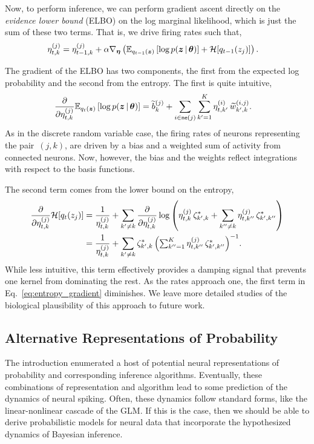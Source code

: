 Now, to perform inference, we can perform gradient ascent directly on the
\emph{evidence lower bound} (ELBO) on the log marginal likelihood,
which is just the sum of these two terms. That is, we drive firing
rates such that,
\begin{align*}
  \eta_{t,k}^{(j)} %
  &= \eta_{t-1,k}^{(j)} +
  \alpha \nabla_{\boldsymbol{\eta}} \left( \bbE_{q_{t-1}(\bz)} \left[ \log p(\bz \given \btheta) \right] + \mcH[q_{t-1}(z_j)] \right).
\end{align*}

The gradient of the ELBO has two components, the first from the
expected log probability and the second from the entropy. The first is
quite intuitive,
\begin{align*}
  \frac{\partial}{\partial \eta_{t,k}^{(j)}} \mathbb{E}_{q_t(\boldsymbol{z})} \left[ \log p(\boldsymbol{z} \,|\, \boldsymbol{\theta}) \right]
  &=
  \widetilde{b}_k^{(j)} +
  \sum_{i \in \mathsf{ne}(j)} \sum_{k'=1}^K \eta_{t,k'}^{(i)} \, \widetilde{w}_{k',k}^{(i,j)}.
\end{align*} 
As in the discrete random variable case, the firing rates of neurons representing
the pair~$(j,k)$, are driven by a bias and a weighted sum of activity from
connected neurons. Now, however, the bias and the weights reflect integrations
with respect to the basis functions.

The second term comes from the lower bound on the entropy, 
\begin{align}
  \frac{\partial}{\partial \eta_{t,k}^{(j)}} \mathcal{H}[q_t(z_j)] 
  &=
  \frac{1}{\eta_{t,k}^{(j)}}
  + \sum_{k' \neq k} \frac{\partial}{\partial \eta_{t,k}^{(j)}}
  \log \left( \eta_{t,k}^{(j)} \, \zeta_{k',k}^\ast
  + \sum_{k''\neq k} \eta_{t,k''}^{(j)} \, \zeta_{k',k''}^\ast \right) \\
  \label{eq:entropy_gradient}
  &= \frac{1}{\eta_{t,k}^{(j)}}
  + \sum_{k'\neq k}
  {\zeta^{\ast}_{k',k}} \,
  \Big({\textstyle{\sum}_{k''=1}^K \, \eta_{t,k''}^{(j)} \, \zeta_{k',k''}^\ast} \Big)^{-1}.
\end{align}
While less intuitive, this term effectively provides a damping 
signal that prevents one kernel from dominating the rest. As the
rates approach one, the first term in Eq.~\ref{eq:entropy_gradient}
diminishes. We leave more detailed studies of the biological plausibility
of this approach to future work.

\subsection{Alternative Representations of Probability}
The introduction enumerated a host of potential neural representations
of probability and corresponding inference algorithms. Eventually, these
combinations of representation and algorithm lead to some prediction of
the dynamics of neural spiking. Often, these dynamics follow standard forms,
like the linear-nonlinear cascade of the GLM. If this is the case, then
we should be able to derive probabilistic models for neural data that
incorporate the hypothesized dynamics of Bayesian inference.

